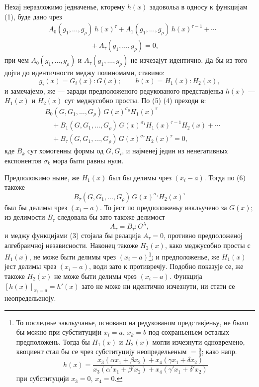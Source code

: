 ﻿\documentclass[11pt]{article}
\begin{document}
Нехај неразложимо једначенье, кторему $h(x)$ задовольа в односу к функцијам (1), буде дано чрез
\begin{equation}
\begin{aligned}
&A_0(g_1,\ldots,g_\rho)\,h(x)^\tau
 +A_1(g_1,\ldots,g_\rho)\,h(x)^{\tau-1}
 +\cdots \\
&\hspace{6em}+A_\tau(g_1,\ldots,g_\rho)=0,
\end{aligned}
\tag{4}
\end{equation}
при чем $A_0(g_1,\ldots,g_\rho)$ и $A_\tau(g_1,\ldots,g_\rho)$ не изчезајут идентично. Да бы из того дојти до идентичности меджу полиномами, ставимо:
\begin{equation}
  g_i(x)=G_i(x):G(x);\qquad h(x)=H_1(x):H_2(x),
\tag{5}
\end{equation}
и замечајемо, же --- заради предположеного редукованого представјеньа $h(x)$ --- $H_1(x)$ и $H_2(x)$ сут меджусобно просты. По (5) (4) преходи в:
\begin{equation}
\begin{aligned}
&B_0(G,G_1,\ldots,G_\rho)\,G(x)^{\sigma_0}H_1(x)^\tau \\
&\quad+B_1(G,G_1,\ldots,G_\rho)\,G(x)^{\sigma_1}H_1(x)^{\tau-1}H_2(x)+\cdots \\
&\quad+B_\tau(G,G_1,\ldots,G_\rho)\,G(x)^{\sigma_\tau}H_2(x)^\tau=0,
\end{aligned}
\tag{6}
\end{equation}
кде $B_k$ сут хомогенны формы од $G,G_i$, и најменеј једин из ненегативных експонентов $\sigma_k$ мора быти равны нули.

Предположимо ныне, же $H_1(x)$ был бы делимы чрез $(x_i-a)$. Тогда по (6) такоже
\[
  B_\tau(G,G_1,\ldots,G_\rho)\,G(x)^{\sigma_\tau}H_2(x)^\tau
\]
был бы делимы чрез $(x_i-a)$. То јест по предположеньу изкльучено за $G(x)$; из делимости $B_\tau$ следовала бы зато такоже делимост
\[
  A_\tau=B_\tau:G^\lambda,
\]
и меджу функцијами (3) стојала бы релација $A_\tau=0$, противно предположеној алгебраичној независности. Наконец такоже $H_2(x)$, како меджусобно просты с $H_1(x)$, не може быти делимы чрез $(x_i-a)$\footnote{То последнье закльучанье, основано на редукованом представјеньу, не было бы можно при субституцији $x_i=a$, $x_k=b$ под сохраньеньем осталых предположень. Тогда бы $H_1(x)$ и $H_2(x)$ могли изчезнути одновремено, квоциент стал бы се чрез субституцију неопредельеным $=\frac{0}{0}$; како напр.
\[
 h(x)=\frac{x_3(\alpha x_1+\beta x_2)+x_4(\gamma x_1+\delta x_2)}
 {x_3(\alpha' x_1+\beta' x_2)+x_4(\gamma' x_1+\delta' x_2)}
\]
при субституцији $x_3=0$, $x_4=0$.}; и предположенье, же $H_1(x)$ јест делимы чрез $(x_i-a)$, води зато к противречју. Подобно показује се, же такоже $H_2(x)$ не може быти делимы чрез $(x_i-a)$. Функција $[h(x)]_{x_i=a}=h'(x)$ зато не може ни идентично изчезнути, ни стати се неопредельеноју.
\end{document}
